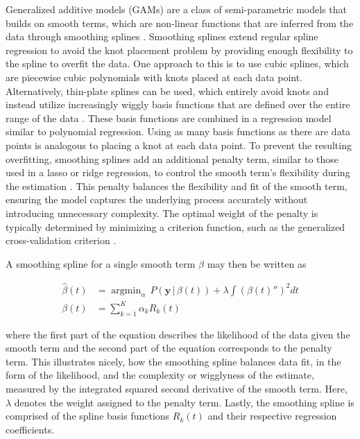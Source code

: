 \documentclass[jou, floatsintext]{apa7}
\DeclareMathOperator*{\argmin}{argmin}
\begin{document}
Generalized additive models (GAMs) are a class of semi-parametric models that
builds on smooth terms, which are non-linear functions that are inferred from
the data through smoothing splines \parencite{wood_generalized_2006,
  wood_inference_2020, hastie_generalized_1999}. Smoothing splines extend
regular
spline regression to avoid the knot placement problem by providing enough
flexibility to the spline to overfit the data. One approach to this is to use
cubic splines, which are piecewise cubic polynomials with knots placed at each
data point. Alternatively, thin-plate splines can be used, which entirely avoid
knots and instead utilize increasingly wiggly basis functions that are defined
over the entire range of the data \parencite{wood_thin_2003}. These basis
functions are combined in a regression model similar to polynomial regression.
Using as many basis functions as there are data points is analogous to placing
a knot at each data point. To prevent the resulting overfitting, smoothing
splines add an additional penalty term, similar to those used in a lasso or
ridge regression, to control the smooth term's flexibility during the
estimation \parencite{gu_smoothing_2013, wahba_spline_1980}. This penalty
balances the flexibility and fit of the smooth term, ensuring the model
captures the underlying process accurately without introducing unnecessary
complexity. The optimal weight of the penalty is typically determined by
minimizing a criterion function, such as the generalized cross-validation
criterion \parencite{wood_generalized_2006, golub_generalized_1997}.

A smoothing spline for a single smooth term $\beta$ may then be written as

\begin{equation}
  \begin{aligned}
    \hat{\beta}(t) & = \argmin_\alpha \, P(\textbf{y} \, | \, \beta(t)) +
    \lambda \int {(\beta(t)'')}^2 dt                                      \\
    \beta(t)       & = \sum^K_{k = 1} \alpha_k R_k(t)
  \end{aligned}
\end{equation}

\noindent where the first part of the equation describes the likelihood
of the data given the smooth term and the second part of the equation
corresponds to the penalty term. This illustrates nicely, how the smoothing
spline balances data fit, in the form of the likelihood, and the complexity or
wigglyness of the estimate, measured by the integrated squared second
derivative of the smooth term. Here, $\lambda$ denotes the weight assigned to
the penalty term. Lastly, the smoothing spline is comprised of the spline
basis functions $R_k(t)$ and their respective regression coefficients.
\end{document}
